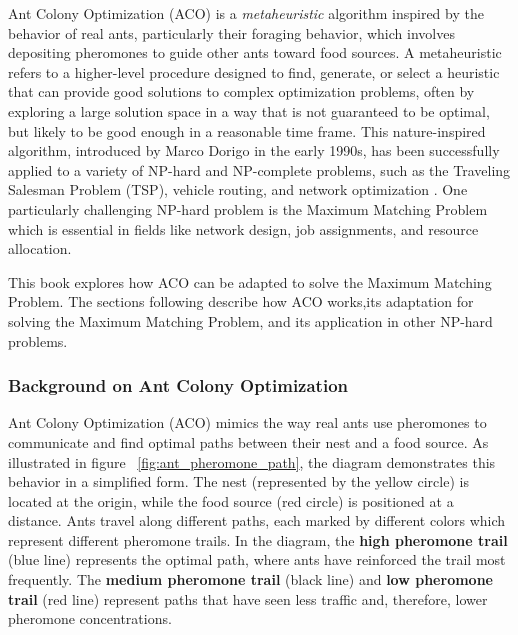 Ant Colony Optimization (ACO) is a \textit{metaheuristic} algorithm inspired by the behavior of real ants, particularly their foraging behavior, which involves depositing pheromones to guide other ants toward food sources. A metaheuristic refers to a higher-level procedure designed to find, generate, or select a heuristic that can provide good solutions to complex optimization problems, often by exploring a large solution space in a way that is not guaranteed to be optimal, but likely to be good enough in a reasonable time frame. This nature-inspired algorithm, introduced by Marco Dorigo in the early 1990s, has been successfully applied to a variety of NP-hard and NP-complete problems, such as the Traveling Salesman Problem (TSP), vehicle routing, and network optimization \cite{Dorigo2004}. One particularly challenging NP-hard problem is the Maximum Matching Problem which is essential in fields like network design, job assignments, and resource allocation.

This book explores how ACO can be adapted to solve the Maximum Matching Problem. The sections following describe how ACO works,its adaptation for solving the Maximum Matching Problem, and its application in other NP-hard problems.

\subsubsection*{Background on Ant Colony Optimization}

Ant Colony Optimization (ACO) mimics the way real ants use pheromones to communicate and find optimal paths between their nest and a food source. As illustrated in figure ~\ref{fig:ant_pheromone_path}, the diagram demonstrates this behavior in a simplified form. The nest (represented by the yellow circle) is located at the origin, while the food source (red circle) is positioned at a distance. Ants travel along different paths, each marked by different colors which represent different pheromone trails. In the diagram, the \textbf{high pheromone trail} (blue line) represents the optimal path, where ants have reinforced the trail most frequently. The \textbf{medium pheromone trail} (black line) and \textbf{low pheromone trail} (red line) represent paths that have seen less traffic and, therefore, lower pheromone concentrations.
 

